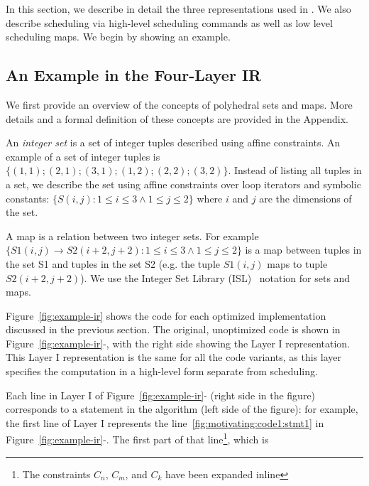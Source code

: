 In this section, we describe in detail the three representations used in \framework{}.  We also describe scheduling via  high-level scheduling commands as well as low level scheduling maps. We begin by showing an example.


\vspace{-0.25cm}
\subsection{An Example in the Four-Layer IR}

We first provide an overview of the concepts of polyhedral sets and maps.  More details and a formal definition of these concepts are provided in the Appendix.

An \emph{integer set} is a set of integer tuples described using affine constraints.  An example of a set of integer tuples is $\{(1,1); (2,1); (3,1); (1,2); (2,2); (3,2)\}$.
Instead of listing all tuples in a set, we describe the set using affine constraints over loop iterators and symbolic constants: $\{S(i,j): 1 \leq i \leq 3 \wedge 1 \leq j \leq 2\}$ where $i$ and $j$ are the dimensions of the set.

A map is a relation between two integer sets.  For example $\{S1(i,j) \rightarrow S2(i+2,j+2) : 1 \leq i \leq 3 \wedge 1 \leq j \leq 2\}$ is a map between tuples in the set S1 and tuples in the set S2 (e.g. the tuple $S1(i,j)$ maps to tuple $S2(i+2,j+2)$).  We use the Integer Set Library (ISL)~\cite{verdoolaege_isl:_2010} notation for sets and maps.

Figure~\ref{fig:example-ir} shows the code for each optimized implementation discussed in the previous section.
The original, unoptimized code is shown in Figure~\ref{fig:example-ir}-\codeone{}, with the right side showing the Layer I representation.
This Layer I representation is the same for all the code variants, as this layer specifies the computation in a high-level form separate from scheduling.   %

Each line in Layer I of Figure~\ref{fig:example-ir}-\codeone{} (right side in the figure) corresponds to a statement in the algorithm (left side of the figure): for example, the first line of Layer I represents the line~\ref{fig:motivating:code1:stmt1} in Figure~\ref{fig:example-ir}-\codeone{}.
The first part of that line\footnote{The constraints $C_n$, $C_m$, and $C_k$ have been expanded inline}, which is


